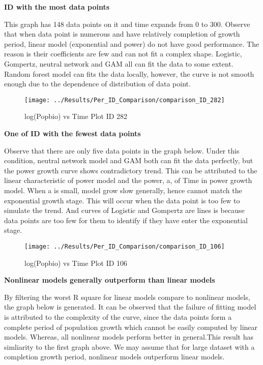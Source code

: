 \documentclass[11pt]{article}
\begin{document}
\textbf{ID with the most data points}

This graph has 148 data points on it and time expands from 0 to 300. Observe that when data point is numerous and have relatively completion of growth period, linear model (exponential and power) do not have good performance. The reason is their coefficients are few and can not fit a complex shape. Logistic, Gompertz, neutral network and GAM all can fit the data to some extent. Random forest model can fits the data locally, however, the curve is not smooth enough due to the dependence of distribution of data point. 

\begin{figure}[H]
    \centering
    \texttt{[image: ../Results/Per\_ID\_Comparison/comparison\_ID\_282]} 
    \caption{log(Popbio) vs Time Plot ID 282}
    \label{fig:scatter1}
\end{figure}

\noindent \textbf{One of ID with the fewest data points}

Observe that there are only five data points in the graph below. Under this condition, neutral network model and GAM both can fit the data perfectly, but the power growth curve shows contradictory trend. This can be attributed to the linear characteristic of power model and the power, a, of Time in power growth model. When a is small, model grow slow generally, hence cannot match the exponential growth stage. This will occur when the data point is too few to simulate the trend. And curves of Logistic and Gompertz are lines is because data points are too few for them to identify if they have enter the exponential stage.

\begin{figure}[H]
    \centering
    \texttt{[image: ../Results/Per\_ID\_Comparison/comparison\_ID\_106]} 
    \caption{log(Popbio) vs Time Plot ID 106}
    \label{fig:scatter2}
\end{figure}

\noindent \textbf{Nonlinear models generally outperform than linear models}

By filtering the worst R square for linear models compare to nonlinear models, the graph below is generated. It can be observed that the failure of fitting model is attributed to the complexity of the curve, since the data points form a complete period of population growth which cannot be easily computed by linear models. Whereas, all nonlinear models perform better in general.This result has simliarity to the first graph above. We may assume that for large dataset with a completion growth period, nonlinear models outperform linear models.
\end{document}
